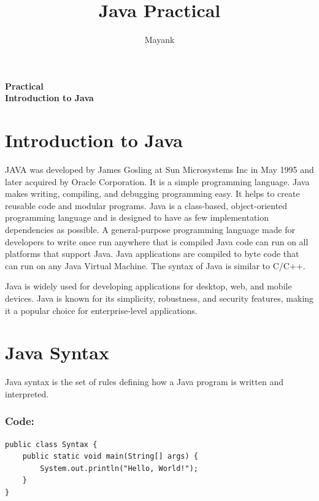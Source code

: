 \documentclass[a4paper,12pt]{article}
\title{\textbf{Java Practical}}
\author{Mayank}
\date{}
\newcounter{practicalno} %
\newcommand{\practicaltitle}[1]{
    \stepcounter{practicalno} %
    \newpage
    \begin{center}
        \vspace{1cm}
        \Large\textbf{Practical \thepracticalno} \\
        \vspace{0.5cm}
        \Large\textbf{#1} %
        \normalsize\vspace{1cm}
    \end{center}
}
\begin{document}
\maketitle

\practicaltitle{Introduction to Java}

\section{Introduction to Java}
JAVA was developed by James Gosling at Sun Microsystems Inc in May 1995 and later acquired by Oracle Corporation. It is a simple programming language. Java makes writing, compiling, and debugging programming easy. It helps to create reusable code and modular programs. Java is a class-based, object-oriented programming language and is designed to have as few implementation dependencies as possible. A general-purpose programming language made for developers to write once run anywhere that is compiled Java code can run on all platforms that support Java. Java applications are compiled to byte code that can run on any Java Virtual Machine. The syntax of Java is similar to C/C++.

Java is widely used for developing applications for desktop, web, and mobile devices. Java is known for its simplicity, robustness, and security features, making it a popular choice for enterprise-level applications.

\section{Java Syntax}
Java syntax is the set of rules defining how a Java program is written and interpreted.
\subsubsection{Code: }
\begin{lstlisting}
public class Syntax {
    public static void main(String[] args) {
        System.out.println("Hello, World!");
    }
}
\end{lstlisting}

\end{document}
